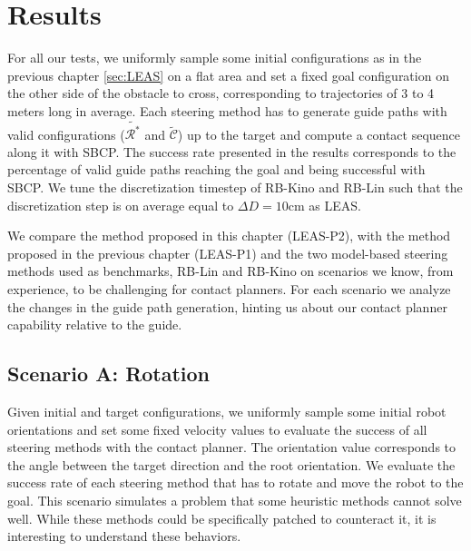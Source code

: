 \section{Results\label{sub:cp-sb:results}}

For all our tests, we uniformly sample some initial configurations as in the previous chapter \ref{sec:LEAS} on a flat area and set a fixed goal configuration on the other side of the obstacle to cross, corresponding to trajectories of 3 to 4 meters long in average.
Each steering method has to generate guide paths with valid configurations ($\tilde{\mathcal{R}^*}$ and $\tilde{\mathcal{C}}$) up to the target and compute a contact sequence along it with SBCP.
The success rate presented in the results corresponds to the percentage of valid guide paths reaching the goal and being successful with SBCP.
We tune the discretization timestep of RB-Kino and RB-Lin such that the discretization step is on average equal to $\Delta D=10$cm as LEAS.

We compare the method proposed in this chapter (LEAS-P2), with the method proposed in the previous chapter (LEAS-P1) and the two model-based steering methods used as benchmarks, RB-Lin and RB-Kino on scenarios we know, from experience, to be challenging for contact planners. For each scenario we analyze the changes in the guide path generation, hinting us about our contact planner capability relative to the guide.

\subsection{Scenario A: Rotation\label{subsub:sbcp:rotation}}
Given initial and target configurations, we uniformly sample some initial robot orientations and set some fixed velocity values to evaluate the success of all steering methods with the contact planner. The orientation value corresponds to the angle between the target direction and the root orientation. 
We evaluate the success rate of each steering method that has to rotate and move the robot to the goal. 
This scenario simulates a problem that some heuristic methods cannot solve well. While these methods could be specifically patched to counteract it, it is interesting to understand these behaviors.

